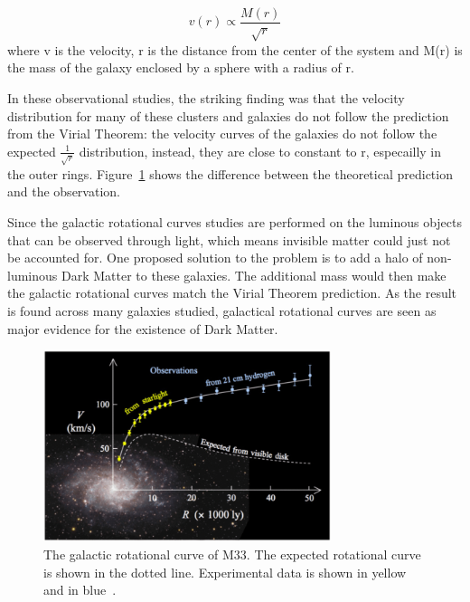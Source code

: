     \begin{equation}
      v(r) \varpropto \frac{M(r)}{\sqrt{r}}
    \end{equation}
     where v is the velocity, r is the distance from the center of the system and M(r) is the mass of the galaxy enclosed by a sphere with a radius of r. 

     In these observational studies, the striking finding was that the velocity distribution for many of these clusters and galaxies do not follow the prediction from the Virial Theorem: the velocity curves of the galaxies do not follow the expected $\frac{1}{\sqrt{r}}$ distribution, instead, they are close to constant to r, especailly in the outer rings. Figure~\ref{fig:M33figure} shows the difference between the theoretical prediction and the observation. 

     Since the galactic rotational curves studies are performed on the luminous objects that can be observed through light, which means invisible matter could just not be accounted for. One proposed solution to the problem is to add a halo of non-luminous Dark Matter to these galaxies. The additional mass would then make the galactic rotational curves match the Virial Theorem prediction. As the result is found across many galaxies studied, galactical rotational curves are seen as major evidence for the existence of Dark Matter. 

\begin{figure}[!htb]
    \begin{center}
        \includegraphics[width=0.75\textwidth]{figures/chapter_DM/M33-rotation-curve}
        \caption{
            The galactic rotational curve of M33. The expected rotational curve is shown in the dotted line. Experimental data is shown in yellow and in blue~\cite{M33}.
        }
        \label{fig:M33figure}
    \end{center}
\end{figure}

